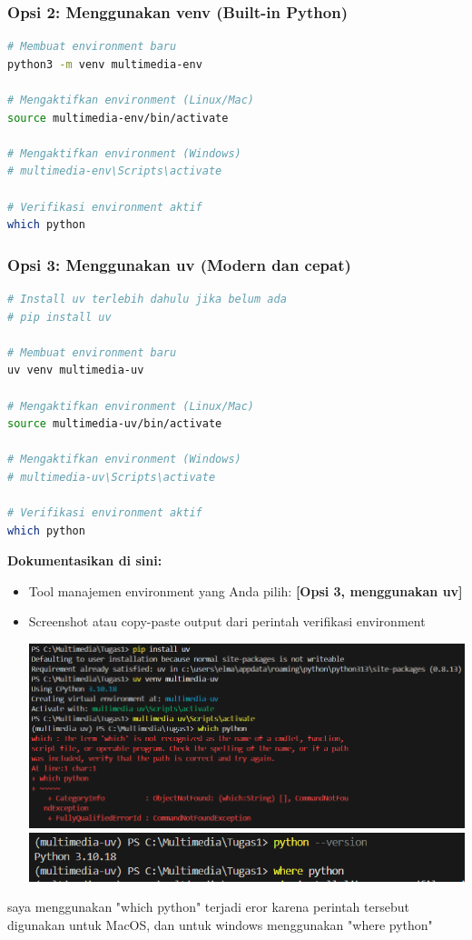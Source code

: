 \documentclass[11pt,a4paper]{article}
\begin{document}
\subsubsection{Opsi 2: Menggunakan venv (Built-in Python)}
\begin{lstlisting}[language=bash, caption=Membuat environment dengan venv]
# Membuat environment baru
python3 -m venv multimedia-env

# Mengaktifkan environment (Linux/Mac)
source multimedia-env/bin/activate

# Mengaktifkan environment (Windows)
# multimedia-env\Scripts\activate

# Verifikasi environment aktif
which python
\end{lstlisting}

\subsubsection{Opsi 3: Menggunakan uv (Modern dan cepat)}
\begin{lstlisting}[language=bash, caption=Membuat environment dengan uv]
# Install uv terlebih dahulu jika belum ada
# pip install uv

# Membuat environment baru
uv venv multimedia-uv

# Mengaktifkan environment (Linux/Mac)
source multimedia-uv/bin/activate

# Mengaktifkan environment (Windows)
# multimedia-uv\Scripts\activate

# Verifikasi environment aktif
which python
\end{lstlisting}

\textbf{Dokumentasikan di sini:}
\begin{itemize}
    \item Tool manajemen environment yang Anda pilih: \textbf{[Opsi 3, menggunakan uv]}
    \item Screenshot atau copy-paste output dari perintah verifikasi environment
    \begin{center}
	\includegraphics[scale = 0.5]{Figure/Screenshot 2025-08-28 185613.png}
    \includegraphics[scale = 0.8]{Figure/Screenshot 2025-08-28 190314.png}
	\vspace{0.1cm}
    \end{center}
\end{itemize}
    saya menggunakan "which python" terjadi eror karena perintah tersebut digunakan untuk MacOS, dan untuk windows menggunakan "where python"
\end{document}
